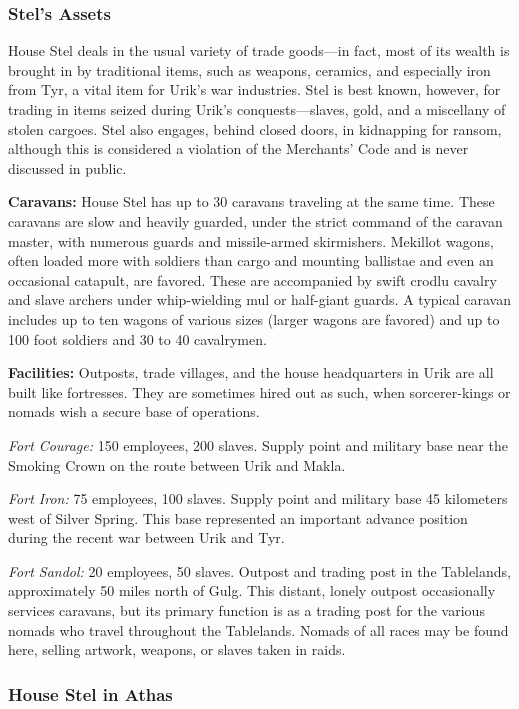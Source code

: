 \subsubsection{Stel's Assets}
House Stel deals in the usual variety of trade goods---in fact, most of its wealth is brought in by traditional items, such as weapons, ceramics, and especially iron from Tyr, a vital item for Urik's war industries. Stel is best known, however, for trading in items seized during Urik's conquests---slaves, gold, and a miscellany of stolen cargoes. Stel also engages, behind closed doors, in kidnapping for ransom, although this is considered a violation of the Merchants' Code and is never discussed in public.

\textbf{Caravans:} House Stel has up to 30 caravans traveling at the same time. These caravans are slow and heavily guarded, under the strict command of the caravan master, with numerous guards and missile-armed skirmishers. Mekillot wagons, often loaded more with soldiers than cargo and mounting ballistae and even an occasional catapult, are favored. These are accompanied by swift crodlu cavalry and slave archers under whip-wielding mul or half-giant guards. A typical caravan includes up to ten wagons of various sizes (larger wagons are favored) and up to 100 foot soldiers and 30 to 40 cavalrymen.

\textbf{Facilities:} Outposts, trade villages, and the house headquarters in Urik are all built like fortresses. They are sometimes hired out as such, when sorcerer-kings or nomads wish a secure base of operations.

\textit{Fort Courage:} 150 employees, 200 slaves. Supply point and military base near the Smoking Crown on the route between Urik and Makla.

\textit{Fort Iron:} 75 employees, 100 slaves. Supply point and military base 45 kilometers west of Silver Spring. This base represented an important advance position during the recent war between Urik and Tyr.

\textit{Fort Sandol:} 20 employees, 50 slaves. Outpost and trading post in the Tablelands, approximately 50 miles north of Gulg. This distant, lonely outpost occasionally services caravans, but its primary function is as a trading post for the various nomads who travel throughout the Tablelands. Nomads of all races may be found here, selling artwork, weapons, or slaves taken in raids.

\subsubsection{House Stel in Athas}

